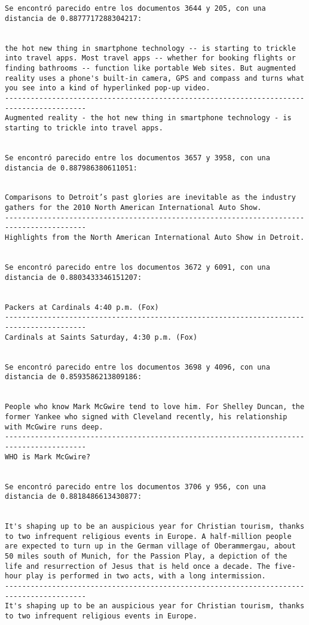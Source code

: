 \documentclass[11pt]{article}
\begin{document}
\begin{Verbatim}[commandchars=\\\{\}]
Se encontró parecido entre los documentos 3644 y 205, con una distancia de 0.8877717288304217:


the hot new thing in smartphone technology -- is starting to trickle into travel apps. Most travel apps -- whether for booking flights or finding bathrooms -- function like portable Web sites. But augmented reality uses a phone's built-in camera, GPS and compass and turns what you see into a kind of hyperlinked pop-up video.
-----------------------------------------------------------------------------------------
Augmented reality - the hot new thing in smartphone technology - is starting to trickle into travel apps.


Se encontró parecido entre los documentos 3657 y 3958, con una distancia de 0.887986380611051:


Comparisons to Detroit’s past glories are inevitable as the industry gathers for the 2010 North American International Auto Show.
-----------------------------------------------------------------------------------------
Highlights from the North American International Auto Show in Detroit.


Se encontró parecido entre los documentos 3672 y 6091, con una distancia de 0.8803433346151207:


Packers at Cardinals 4:40 p.m. (Fox)
-----------------------------------------------------------------------------------------
Cardinals at Saints Saturday, 4:30 p.m. (Fox)


Se encontró parecido entre los documentos 3698 y 4096, con una distancia de 0.8593586213809186:


People who know Mark McGwire tend to love him. For Shelley Duncan, the former Yankee who signed with Cleveland recently, his relationship with McGwire runs deep.
-----------------------------------------------------------------------------------------
WHO is Mark McGwire?


Se encontró parecido entre los documentos 3706 y 956, con una distancia de 0.8818486613430877:


It's shaping up to be an auspicious year for Christian tourism, thanks to two infrequent religious events in Europe. A half-million people are expected to turn up in the German village of Oberammergau, about 50 miles south of Munich, for the Passion Play, a depiction of the life and resurrection of Jesus that is held once a decade. The five-hour play is performed in two acts, with a long intermission.
-----------------------------------------------------------------------------------------
It's shaping up to be an auspicious year for Christian tourism, thanks to two infrequent religious events in Europe.



\end{Verbatim}
\end{document}
